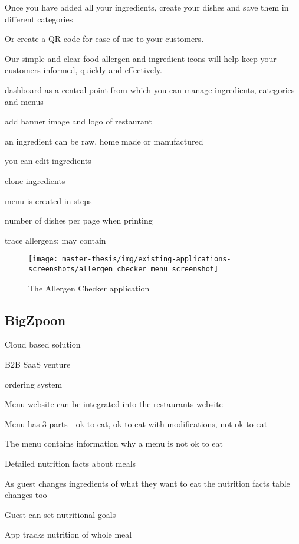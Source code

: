   Once you have added all your ingredients, create your dishes and save them in different categories

  Or create a QR code for ease of use to your customers.

  Our simple and clear food allergen and ingredient icons will help keep your customers informed, quickly and effectively.

  dashboard as a central point from which you can manage ingredients, categories and menus

  add banner image and logo of restaurant

  an ingredient can be raw, home made or manufactured

  you can edit ingredients

  clone ingredients

  menu is created in steps

  number of dishes per page when printing

  trace allergens: may contain

  \begin{figure}[h]
    \centering
    \texttt{[image: master-thesis/img/existing-applications-screenshots/allergen\_checker\_menu\_screenshot]}
    \caption{The Allergen Checker application}
  \end{figure}

\subsection*{BigZpoon}
  Cloud based solution

  B2B SaaS venture

  ordering system

  Menu website can be integrated into the restaurants website

  Menu has 3 parts - ok to eat, ok to eat with modifications, not ok to eat

  The menu contains information why a menu is not ok to eat

  Detailed nutrition facts about meals

  As guest changes ingredients of what they want to eat the nutrition facts table changes too

  Guest can set nutritional goals

  App tracks nutrition of whole meal

